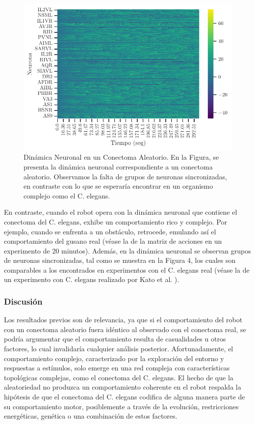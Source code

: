 \begin{figure}[h!]
	\centering\includegraphics[width=\imsize]{matriz_valores_aleatorio.pdf}
	\caption[ Dinámica Neuronal en un Conectoma Aleatorio.]{ Dinámica Neuronal en un Conectoma Aleatorio.  En la Figura, se presenta la dinámica neuronal correspondiente a un conectoma aleatorio. Observamos la falta de grupos de neuronas sincronizadas, en contraste con lo que se esperaría encontrar en un organismo complejo como el C. elegans. }\label{fig:comportamiento_aleatorioneurona}
\end{figure}



En contraste, cuando el robot opera con la dinámica neuronal que contiene el conectoma del C. elegans, exhibe un comportamiento rico y complejo. Por ejemplo, cuando se enfrenta a un obstáculo, retrocede, emulando así el comportamiento del gusano real (véase la  de la matriz de acciones en un experimento de 20 minutos). Además, en la dinámica neuronal se observan grupos de neuronas sincronizadas, tal como se muestra en la Figura 4, los cuales son comparables a los encontrados en experimentos con el C. elegans real (véase la  de un experimento con C. elegans realizado por Kato et al. \cite{kato_global_2015}).


\subsubsection{Discusión}

Los resultados previos son de relevancia, ya que si el comportamiento del robot con un conectoma aleatorio fuera idéntico al observado con el conectoma real, se podría argumentar que el comportamiento resulta de casualidades u otros factores, lo cual invalidaría cualquier análisis posterior. Afortunadamente, el comportamiento complejo, caracterizado por la exploración del entorno y respuestas a estímulos, solo emerge en una red compleja con características topológicas complejas, como el conectoma del C. elegans. El hecho de que la aleatoriedad no produzca un comportamiento coherente en el robot respalda la hipótesis de que el conectoma del C. elegans codifica de alguna manera parte de su comportamiento motor, posiblemente a través de la evolución, restricciones energéticas, genética o una combinación de estos factores. 

